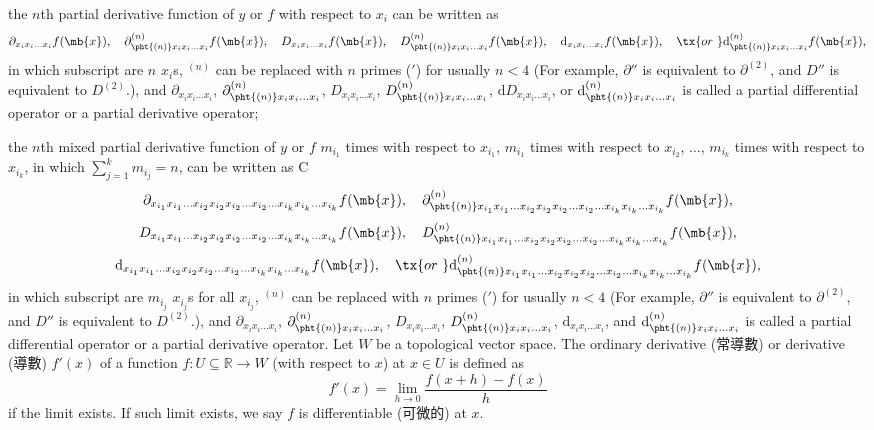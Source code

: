 \documentclass[a4paper,12pt]{report}
\begin{document}
\begin{itemize}
\begin{itemize}
the $n$th partial derivative function of $y$ or $f$ with respect to $x_i$ can be written as
\[\partial_{x_ix_i\dots  x_i}f(\mb{x}),\quad\partial^{(n)}_{\pht{(n)}x_ix_i\dots  x_i}f(\mb{x}),\quad D_{x_ix_i\dots  x_i}f(\mb{x}),\quad D^{(n)}_{\pht{(n)}x_ix_i\dots  x_i}f(\mb{x}),\quad \mathrm{d}_{x_ix_i\dots  x_i}f(\mb{x}),\quad\tx{or\ }\mathrm{d}^{(n)}_{\pht{(n)}x_ix_i\dots  x_i}f(\mb{x}),\]
in which subscript are $n$ $x_i$s, $^{(n)}$ can be replaced with $n$ primes ($'$) for usually $n<4$ (For example, $\partial''$ is equivalent to $\partial^{(2)}$, and $D''$ is equivalent to $D^{(2)}$.), and $\partial_{x_ix_i\dots  x_i}$, $\partial^{(n)}_{\pht{(n)}x_ix_i\dots  x_i}$, $D_{x_ix_i\dots  x_i}$, $D^{(n)}_{\pht{(n)}x_ix_i\dots  x_i}$, $\mathrm{d}D_{x_ix_i\dots  x_i}$, or $\mathrm{d}^{(n)}_{\pht{(n)}x_ix_i\dots  x_i}$ is called a partial differential operator or a partial derivative operator;

the $n$th mixed partial derivative function of $y$ or $f$ $m_{i_1}$ times with respect to $x_{i_1}$, $m_{i_1}$ times with respect to $x_{i_2}$, $\dots $, $m_{i_k}$ times with respect to $x_{i_k}$, in which $\sum_{j=1}^km_{i_j}=n$, can be written as
C\[\partial_{x_{i_1}x_{i_1}\dots  x_{i_2}x_{i_2}x_{i_2}\dots  x_{i_2}\dots  x_{i_k}x_{i_k}\dots  x_{i_k}}f(\mb{x}),\quad\partial^{(n)}_{\pht{(n)}x_{i_1}x_{i_1}\dots  x_{i_2}x_{i_2}x_{i_2}\dots  x_{i_2}\dots  x_{i_k}x_{i_k}\dots  x_{i_k}}f(\mb{x}),\]
\[ D_{x_{i_1}x_{i_1}\dots  x_{i_2}x_{i_2}x_{i_2}\dots  x_{i_2}\dots  x_{i_k}x_{i_k}\dots  x_{i_k}}f(\mb{x}),\quad D^{(n)}_{\pht{(n)}x_{i_1}x_{i_1}\dots  x_{i_2}x_{i_2}x_{i_2}\dots  x_{i_2}\dots  x_{i_k}x_{i_k}\dots  x_{i_k}}f(\mb{x}),\]
\[ \mathrm{d}_{x_{i_1}x_{i_1}\dots  x_{i_2}x_{i_2}x_{i_2}\dots  x_{i_2}\dots  x_{i_k}x_{i_k}\dots  x_{i_k}}f(\mb{x}),\quad\tx{or\ }\mathrm{d}^{(n)}_{\pht{(n)}x_{i_1}x_{i_1}\dots  x_{i_2}x_{i_2}x_{i_2}\dots  x_{i_2}\dots  x_{i_k}x_{i_k}\dots  x_{i_k}}f(\mb{x}),\]
in which subscript are $m_{i_j}$ $x_{i_j}$s for all $x_{i_j}$, $^{(n)}$ can be replaced with $n$ primes ($'$) for usually $n<4$ (For example, $\partial''$ is equivalent to $\partial^{(2)}$, and $D''$ is equivalent to $D^{(2)}$.), and $\partial_{x_ix_i\dots  x_i}$, $\partial^{(n)}_{\pht{(n)}x_ix_i\dots  x_i}$, $D_{x_ix_i\dots  x_i}$, $D^{(n)}_{\pht{(n)}x_ix_i\dots  x_i}$, $\mathrm{d}_{x_ix_i\dots  x_i}$, and $\mathrm{d}^{(n)}_{\pht{(n)}x_ix_i\dots  x_i}$ is called a partial differential operator or a partial derivative operator.
Let $W$ be a topological vector space. The ordinary derivative (常導數) or derivative (導數) $f'(x)$ of a function $f\colon U\subseteq\mathbb{R}\to W$ (with respect to $x$) at $x\in U$ is defined as
\[f'(x)=\lim_{h\to 0}\frac{f(x+h)-f(x)}{h}\]
if the limit exists. If such limit exists, we say $f$ is differentiable (可微的) at $x$.


\end{itemize}
\end{itemize}
\end{document}
